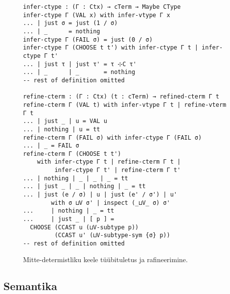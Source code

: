 \documentclass[a4paper,12pt]{article}
\begin{document}
\begin{figure}
  \begin{BVerbatim}
infer-ctype : (Γ : Ctx) → cTerm → Maybe CType
infer-ctype Γ (VAL x) with infer-vtype Γ x
... | just σ = just (1 / σ)
... | _      = nothing
infer-ctype Γ (FAIL σ) = just (0 / σ)
infer-ctype Γ (CHOOSE t t') with infer-ctype Γ t | infer-ctype Γ t'
... | just τ | just τ' = τ ⊹C τ'
... | _      | _       = nothing
-- rest of definition omitted

refine-cterm : (Γ : Ctx) (t : cTerm) → refined-cterm Γ t
refine-cterm Γ (VAL t) with infer-vtype Γ t | refine-vterm Γ t
... | just _ | u = VAL u
... | nothing | u = tt 
refine-cterm Γ (FAIL σ) with infer-ctype Γ (FAIL σ)
... | _ = FAIL σ
refine-cterm Γ (CHOOSE t t')
    with infer-ctype Γ t | refine-cterm Γ t |
         infer-ctype Γ t' | refine-cterm Γ t'
... | nothing | _ | _ | _ = tt
... | just _ | _ | nothing | _ = tt
... | just (e / σ) | u | just (e' / σ') | u'
        with σ ⊔V σ' | inspect (_⊔V_ σ) σ'
...     | nothing | _ = tt
...     | just _ | [ p ] =
  CHOOSE (CCAST u (⊔V-subtype p))
         (CCAST u' (⊔V-subtype-sym {σ} p))
-- rest of definition omitted
  \end{BVerbatim}
  \caption{Mitte-determistliku keele tüübituletus ja rafineerimine.}
  \label{fig:nd.refine}
\end{figure}


\subsection{Semantika}
\end{document}
